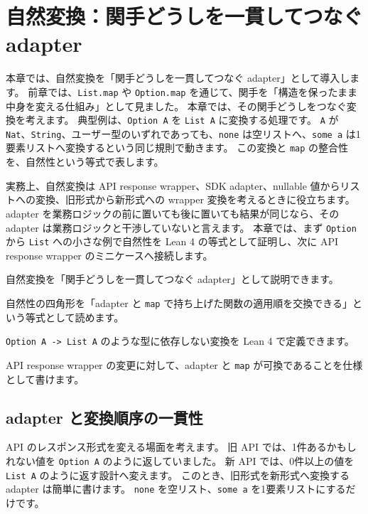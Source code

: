 \chapter{自然変換：関手どうしを一貫してつなぐ adapter}
\label{chap:natural-transformation}

\begin{chapterabstract}
本章では、自然変換を「関手どうしを一貫してつなぐ adapter」として導入します。
前章では、\texttt{List.map} や \texttt{Option.map} を通じて、関手を「構造を保ったまま中身を変える仕組み」として見ました。
本章では、その関手どうしをつなぐ変換を考えます。
典型例は、\texttt{Option A} を \texttt{List A} に変換する処理です。
\texttt{A} が \texttt{Nat}、\texttt{String}、ユーザー型のいずれであっても、\texttt{none} は空リストへ、\texttt{some a} は1要素リストへ変換するという同じ規則で動きます。
この変換と \texttt{map} の整合性を、自然性という等式で表します。

実務上、自然変換は API response wrapper、SDK adapter、nullable 値からリストへの変換、旧形式から新形式への wrapper 変換を考えるときに役立ちます。
adapter を業務ロジックの前に置いても後に置いても結果が同じなら、その adapter は業務ロジックと干渉していないと言えます。
本章では、まず \texttt{Option} から \texttt{List} への小さな例で自然性を Lean 4 の等式として証明し、次に API response wrapper のミニケースへ接続します。
\end{chapterabstract}

\begin{learninggoals}
\item 自然変換を「関手どうしを一貫してつなぐ adapter」として説明できます。
\item 自然性の四角形を「adapter と \texttt{map} で持ち上げた関数の適用順を交換できる」という等式として読めます。
\item \texttt{Option A -> List A} のような型に依存しない変換を Lean 4 で定義できます。
\item API response wrapper の変更に対して、adapter と \texttt{map} が可換であることを仕様として書けます。
\end{learninggoals}

\section{adapter と変換順序の一貫性}

API のレスポンス形式を変える場面を考えます。
旧 API では、1件あるかもしれない値を \texttt{Option A} のように返していました。
新 API では、0件以上の値を \texttt{List A} のように返す設計へ変えます。
このとき、旧形式を新形式へ変換する adapter は簡単に書けます。
\texttt{none} を空リスト、\texttt{some a} を1要素リストにするだけです。

